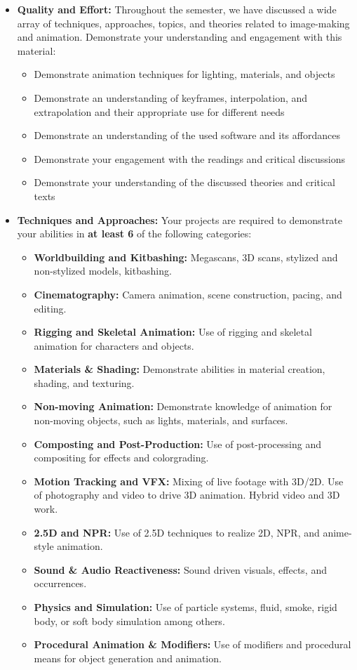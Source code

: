 \begin{itemize}
	\item \textbf{Quality and Effort:} Throughout the semester, we have discussed a wide array of techniques, approaches, topics, and theories related to image-making and animation. Demonstrate your understanding and engagement with this material:
	      \begin{itemize}
		      \item Demonstrate animation techniques for lighting, materials, and objects
		      \item Demonstrate an understanding of keyframes, interpolation, and extrapolation and their appropriate use for different needs
		      \item Demonstrate an understanding of the used software and its affordances
		      \item Demonstrate your engagement with the readings and critical discussions
		      \item Demonstrate your understanding of the discussed theories and critical texts
	      \end{itemize}
	\item \textbf{Techniques and Approaches:} Your projects are required to demonstrate your abilities in \textbf{at least 6} of the following categories:
	      \begin{itemize}
		      \item \textbf{Worldbuilding and Kitbashing:} Megascans, 3D scans, stylized and non-stylized models, kitbashing.
		      \item \textbf{Cinematography:} Camera animation, scene construction, pacing, and editing.
		      \item \textbf{Rigging and Skeletal Animation:} Use of rigging and skeletal animation for characters and objects.
		      \item \textbf{Materials \& Shading:} Demonstrate abilities  in material creation, shading, and texturing.
		      \item \textbf{Non-moving Animation:} Demonstrate knowledge of animation for non-moving objects, such as lights, materials, and surfaces.
		      \item \textbf{Composting and Post-Production:} Use of post-processing and compositing for effects and colorgrading.
		      \item \textbf{Motion Tracking and VFX:} Mixing of live footage with 3D/2D. Use of photography and video to drive 3D animation. Hybrid video and 3D work.
		      \item \textbf{2.5D and NPR:} Use of 2.5D techniques to realize 2D, NPR, and anime-style animation.
		      \item \textbf{Sound \& Audio Reactiveness:} Sound driven visuals, effects, and occurrences.
		      \item \textbf{Physics and Simulation:} Use of particle systems, fluid, smoke, rigid body, or soft body simulation among others.
		      \item \textbf{Procedural Animation \& Modifiers:} Use of modifiers and procedural means for object generation and animation.
	      \end{itemize}
\end{itemize}
